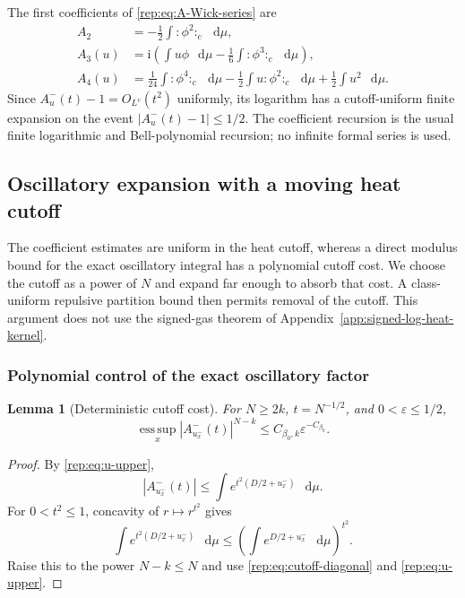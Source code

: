 \documentclass[11pt,reqno]{amsart}
\numberwithin{equation}{section}
\theoremstyle{plain}
\newtheorem{lemma}[lemma]{Lemma}
\theoremstyle{definition}
\newcommand{\dd}{\mathop{}\!\mathrm d}
\newcommand{\be}{\beta}
\newcommand{\vep}{\varepsilon}
\begin{document}
The first coefficients of \eqref{rep:eq:A-Wick-series} are
\begin{align}
 A_2&=-\frac12\int:\!\phi^2\!:_c\,\dd\mu,\label{rep:eq:A2minus}\\
 A_3(u)&=\mathrm{i}\left(\int u\phi\,\dd\mu-\frac16\int:\!\phi^3\!:_c\,\dd\mu\right),\label{rep:eq:A3minus}\\
 A_4(u)&=\frac1{24}\int:\!\phi^4\!:_c\,\dd\mu
 -\frac12\int u:\!\phi^2\!:_c\,\dd\mu
 +\frac12\int u^2\,\dd\mu.\label{rep:eq:A4minus}
\end{align}
Since $A^-_u(t)-1=O_{L^v}(t^2)$ uniformly, its logarithm has a cutoff-uniform finite expansion on the event $|A^-_u(t)-1|\le1/2$. The coefficient recursion is the usual finite logarithmic and Bell-polynomial recursion; no infinite formal series is used.

\subsection{Oscillatory expansion with a moving heat cutoff}

The coefficient estimates are uniform in the heat cutoff, whereas a direct modulus bound for the exact oscillatory integral has a polynomial cutoff cost. We choose the cutoff as a power of $N$ and expand far enough to absorb that cost. A class-uniform repulsive partition bound then permits removal of the cutoff. This argument does not use the signed-gas theorem of Appendix~\ref{app:signed-log-heat-kernel}.

\subsubsection{Polynomial control of the exact oscillatory factor}

\begin{lemma}[Deterministic cutoff cost]\label{rep:lem:deterministic-cost}
For $N\ge2k$, $t=N^{-1/2}$, and $0<\vep\le1/2$,
\begin{equation}\label{rep:eq:deterministic-cost}
 \operatorname*{ess\,sup}_x\left|A^-_{u_x^-}(t)\right|^{N-k}
 \le C_{\be_0,k}\vep^{-C_{\be_0}}.
\end{equation}
\end{lemma}

\begin{proof}
By \eqref{rep:eq:u-upper},
\begin{equation}\label{rep:eq:A-modulus}
 |A^-_{u_x^-}(t)|
 \le\int e^{t^2(D/2+u_x^-)}\,\dd\mu.
\end{equation}
For $0<t^2\le1$, concavity of $r\mapsto r^{t^2}$ gives
\begin{equation}\label{rep:eq:concavity-cost}
 \int e^{t^2(D/2+u_x^-)}\,\dd\mu
 \le\left(\int e^{D/2+u_x^-}\,\dd\mu\right)^{t^2}.
\end{equation}
Raise this to the power $N-k\le N$ and use \eqref{rep:eq:cutoff-diagonal} and \eqref{rep:eq:u-upper}.
\end{proof}
\end{document}
